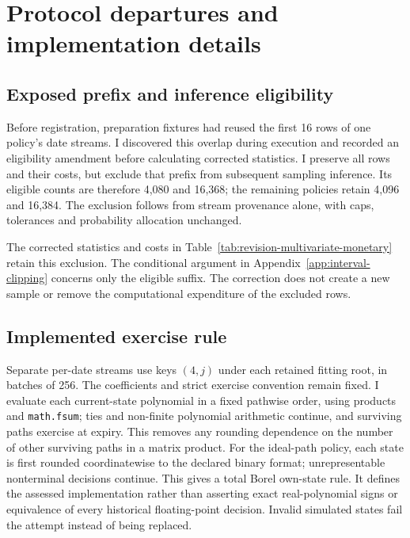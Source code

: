 \documentclass[11pt]{article}
\begin{document}
\section{Protocol departures and implementation details}
\label{app:protocol-departures}

\subsection{Exposed prefix and inference eligibility}

Before registration, preparation fixtures had reused the first 16 rows of one policy's date streams. I discovered this overlap during execution and recorded an eligibility amendment before calculating corrected statistics. I preserve all rows and their costs, but exclude that prefix from subsequent sampling inference. Its eligible counts are therefore 4,080 and 16,368; the remaining policies retain 4,096 and 16,384. The exclusion follows from stream provenance alone, with caps, tolerances and probability allocation unchanged.

The corrected statistics and costs in Table~\ref{tab:revision-multivariate-monetary} retain this exclusion. The conditional argument in Appendix~\ref{app:interval-clipping} concerns only the eligible suffix. The correction does not create a new sample or remove the computational expenditure of the excluded rows.

\subsection{Implemented exercise rule}
\label{app:implemented-rule}

Separate per-date streams use keys $(4,j)$ under each retained fitting root, in batches of 256. The coefficients and strict exercise convention remain fixed. I evaluate each current-state polynomial in a fixed pathwise order, using products and \texttt{math.fsum}; ties and non-finite polynomial arithmetic continue, and surviving paths exercise at expiry. This removes any rounding dependence on the number of other surviving paths in a matrix product. For the ideal-path policy, each state is first rounded coordinatewise to the declared binary format; unrepresentable nonterminal decisions continue. This gives a total Borel own-state rule. It defines the assessed implementation rather than asserting exact real-polynomial signs or equivalence of every historical floating-point decision. Invalid simulated states fail the attempt instead of being replaced.
\end{document}
